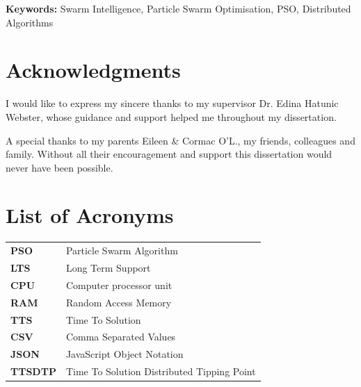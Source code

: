 \documentclass[oneside,12pt]{book}
\begin{document}
\vfill
\noindent
\textbf{Keywords:} \quad Swarm Intelligence, Particle Swarm Optimisation, PSO, Distributed Algorithms

\chapter*{Acknowledgments}

I would like to express my sincere thanks to my supervisor Dr. Edina Hatunic Webster, whose guidance and support helped me throughout my dissertation. 

\vspace{5mm}

{\setlength{\parindent}{0cm}A special thanks to my parents Eileen \& Cormac O'L., my friends, colleagues and family. Without all their encouragement and support this dissertation would never have been possible.}

\newpage
\tableofcontents

\listoffigures

\listoftables

\lstlistoflistings

\chapter*{List of Acronyms}
\begin{table}[H]
  \centering
    \begin{tabular}{ l l }
    \textbf{PSO} & Particle Swarm Algorithm \\
    \textbf{LTS} & Long Term Support \\
    \textbf{CPU} & Computer processor unit \\
    \textbf{RAM} & Random Access Memory \\
    \textbf{TTS} & Time To Solution \\
    \textbf{CSV} & Comma Separated Values \\
    \textbf{JSON} & JavaScript Object Notation \\
    \textbf{TTSDTP} & Time To Solution Distributed Tipping Point \\
    \end{tabular}
\end{table}

\newpage

\fancyhead[RE,LO]{\leftmark}
\renewcommand{\headrulewidth}{2pt}
\end{document}
